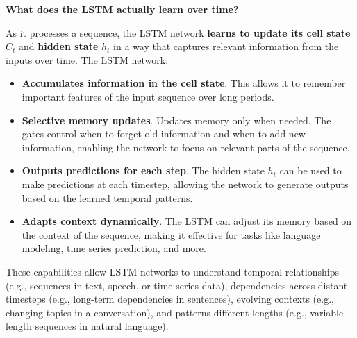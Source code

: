 \begin{flushleft}
    \textcolor{Green3}{ \textbf{What does the LSTM actually learn over time?}}
\end{flushleft}
As it processes a sequence, the LSTM network \textbf{learns to update its cell state} $C_t$ and \textbf{hidden state} $h_t$ in a way that captures relevant information from the inputs over time. The LSTM network:
\begin{itemize}
    \item[\textcolor{Green3}{\faIcon{check}}] \textbf{Accumulates information in the cell state}. This allows it to remember important features of the input sequence over long periods.
    \item[\textcolor{Green3}{\faIcon{check}}] \textbf{Selective memory updates}. Updates memory only when needed. The gates control when to forget old information and when to add new information, enabling the network to focus on relevant parts of the sequence.
    \item[\textcolor{Green3}{\faIcon{check}}] \textbf{Outputs predictions for each step}. The hidden state $h_t$ can be used to make predictions at each timestep, allowing the network to generate outputs based on the learned temporal patterns.
    \item[\textcolor{Green3}{\faIcon{check}}] \textbf{Adapts context dynamically}. The LSTM can adjust its memory based on the context of the sequence, making it effective for tasks like language modeling, time series prediction, and more.
\end{itemize}
These capabilities allow LSTM networks to understand temporal relationships (e.g., sequences in text, speech, or time series data), dependencies across distant timesteps (e.g., long-term dependencies in sentences), evolving contexts (e.g., changing topics in a conversation), and patterns different lengths (e.g., variable-length sequences in natural language).

